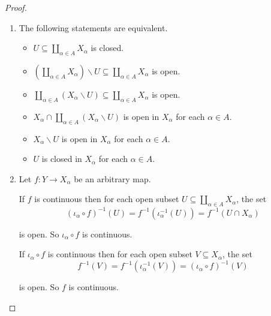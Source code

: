 \begin{proof}
\begin{enumerate}[itemsep=0pt,label={(\alph*)}]
              \( \iota_{\alpha,2} = f\circ \iota_{\alpha,1} \) is continuous for each \( \alpha \in A \) so \( f \) is continuous.

              \( \iota_{\alpha,1} = f^{-1}\circ \iota_{\alpha,2} \) is continuous for each \( \alpha \in A \) so \( f^{-1} \) is continuous.

              Hence \( f \) is a homeomorphism, so \( \mathscr{T}_{1} \) and \( \mathscr{T}_{2} \) are identical.
        \item The following statements are equivalent.
              \begin{itemize}
                  \item \( U \subseteq \coprod_{\alpha\in A} X_{\alpha} \) is closed.
                  \item \( \left(\coprod_{\alpha\in A} X_{\alpha}\right) \smallsetminus U \subseteq \coprod_{\alpha\in A} X_{\alpha} \) is open.
                  \item \( \coprod_{\alpha\in A} (X_{\alpha} \smallsetminus U) \subseteq \coprod_{\alpha\in A} X_{\alpha} \) is open.
                  \item \( X_{\alpha} \cap \coprod_{\alpha\in A} (X_{\alpha} \smallsetminus U) \) is open in \( X_{\alpha} \) for each \( \alpha \in A \).
                  \item \( X_{\alpha} \smallsetminus U \) is open in \( X_{\alpha} \) for each \( \alpha \in A \).
                  \item \( U \) is closed in \( X_{\alpha} \) for each \( \alpha \in A \).
              \end{itemize}
        \item Let \( f: Y \to X_{\alpha} \) be an arbitrary map.

              If \( f \) is continuous then for each open subset \( U \subseteq \coprod_{\alpha\in A} X_{\alpha} \), the set
              \[
                  {(\iota_{\alpha} \circ f)}^{-1}(U) = f^{-1}(\iota_{\alpha}^{-1}(U)) = f^{-1}(U \cap X_{\alpha})
              \]

              is open. So \( \iota_{\alpha} \circ f \) is continuous.

              If \( \iota_{\alpha} \circ f \) is continuous then for each open subset \( V \subseteq X_{\alpha} \), the set
              \[
                  f^{-1}(V) = f^{-1}(\iota_{\alpha}^{-1}(V)) = {(\iota_{\alpha} \circ f)}^{-1}(V)
              \]

              is open. So \( f \) is continuous.


\end{enumerate}
\end{proof}
